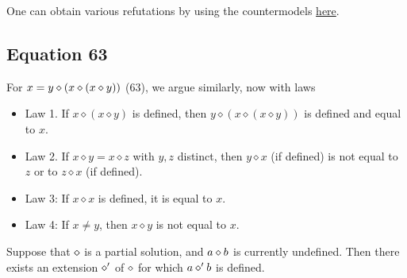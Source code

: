 One can obtain various refutations by using the countermodels \href{https://leanprover.zulipchat.com/#narrow/channel/458659-Equational/topic/713.2C.201289.2C.201447/near/483735768}{here}.

\subsection{Equation 63}


For $x = y \diamond (x \diamond (x \diamond y))$ (63), we argue similarly, now with laws
\begin{itemize}
  \item Law 1.  If $x \diamond (x \diamond y)$ is defined, then $y \diamond (x \diamond (x \diamond y))$ is defined and equal to $x$.
  \item Law 2.  If $x \diamond y = x \diamond z$ with $y,z$ distinct, then $y \diamond x$ (if defined) is not equal to $z$ or to $z \diamond x$ (if defined).
  \item Law 3: If $x \diamond x$ is defined, it is equal to $x$.
  \item Law 4: If $x \neq y$, then $x \diamond y$ is not equal to $x$.
\end{itemize}
\begin{lemma}[63 extension]\label{63-extension}  Suppose that $\diamond$ is a partial solution, and $a \diamond b$ is currently undefined.  Then there exists an extension $\diamond'$ of $\diamond$ for which $a \diamond' b$ is defined.
\end{lemma}

